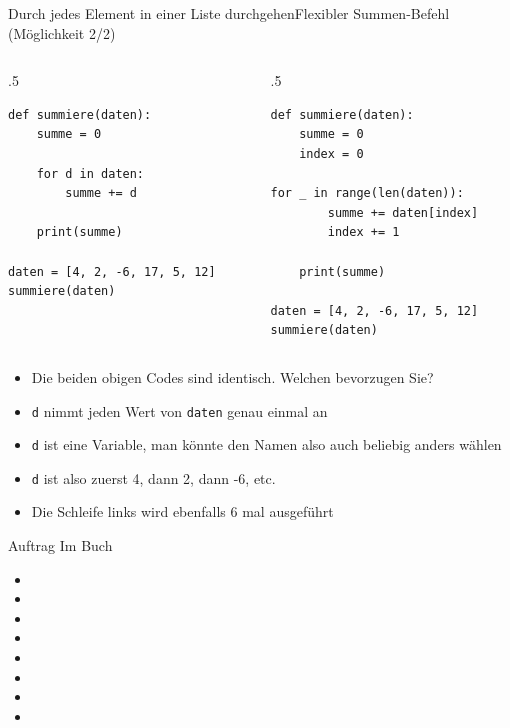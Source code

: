 \begin{frame}[fragile]{Durch jedes Element in einer Liste durchgehen}{Flexibler Summen-Befehl (Möglichkeit 2/2)}
	\begin{columns}
	\begin{column}{.5\textwidth}
	\begin{lstlisting}
def summiere(daten):
	summe = 0

	for d in daten:
		summe += d

	print(summe)

daten = [4, 2, -6, 17, 5, 12] 
summiere(daten)
		\end{lstlisting}
	\end{column}
	\begin{column}{.5\textwidth}
	\begin{lstlisting}
def summiere(daten):
	summe = 0
	index = 0
	
for _ in range(len(daten)):
		summe += daten[index]
		index += 1

	print(summe)

daten = [4, 2, -6, 17, 5, 12] 
summiere(daten)
		\end{lstlisting}
	\end{column}
	\end{columns}
\begin{itemize}[<+->]
	\item Die beiden obigen Codes sind identisch. Welchen bevorzugen Sie?
	\item \lstinline|d| nimmt jeden Wert von \lstinline|daten| genau einmal an
	\item \lstinline|d| ist eine Variable, man könnte den Namen also auch beliebig anders wählen
	\item \lstinline|d| ist also zuerst 4, dann 2, dann -6, etc.
	\item Die Schleife links wird ebenfalls 6 mal ausgeführt
\end{itemize}
\end{frame}

\begin{frame}[fragile]{Auftrag}
Im Buch
\begin{itemize}
	\item {}
	\item {}
	\item {}
	\item {}
	\item {}
	\item {}
	\item {}
	\item {}
\end{itemize}
\end{frame}


